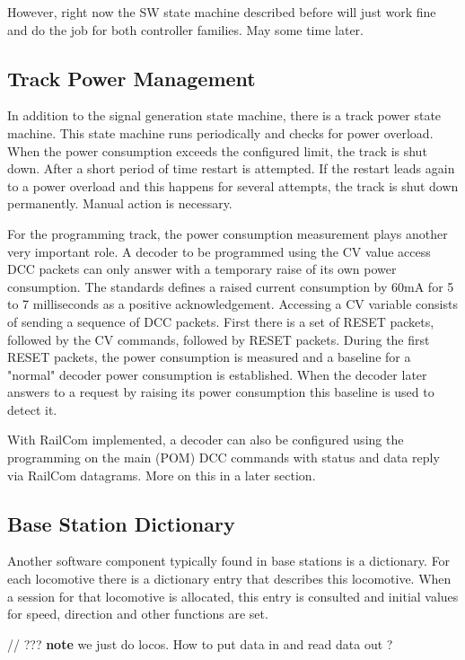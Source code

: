 However, right now the SW state machine described before will just work fine and do the job for both controller families. May some time later.

\subsection{Track Power Management}

In addition to the signal generation state machine, there is a track power state machine. This state machine runs periodically and checks for power overload. When the power consumption exceeds the configured limit, the track is shut down. After a short period of time restart is attempted. If the restart leads again to a power overload and this happens for several attempts, the track is shut down permanently. Manual action is necessary.

For the programming track, the power consumption measurement plays another very important role. A decoder to be programmed using the CV value access DCC packets can only answer with a temporary raise of its own power consumption. The standards defines a raised current consumption by 60mA for 5 to 7 milliseconds as a positive acknowledgement. Accessing a CV variable consists of sending a sequence of DCC packets. First there is a set of RESET packets, followed by the CV commands, followed by RESET packets. During the first RESET packets, the power consumption is measured and a baseline for a "normal" decoder power consumption is established. When the decoder later answers to a request by raising its power consumption this baseline is used to detect it.

With RailCom implemented, a decoder can also be configured using the programming on the main (POM) DCC commands with status and data reply via RailCom datagrams. More on this in a later section.

\subsection{Base Station Dictionary}

Another software component typically found in base stations is a dictionary. For each locomotive there is a dictionary entry that describes this locomotive. When a session for that locomotive is allocated, this entry is consulted and initial values for speed, direction and other functions are set.

// ??? \textbf{note} we just do locos. How to put data in and read data out ?


